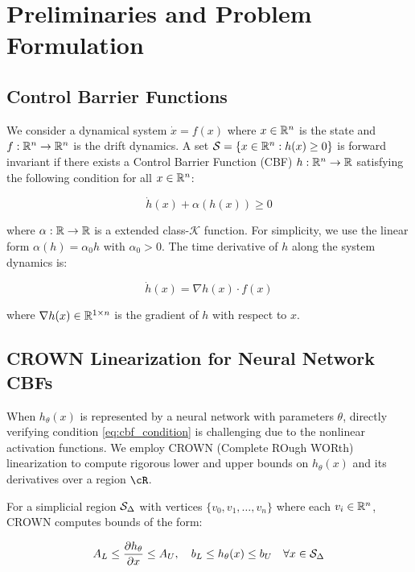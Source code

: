 \section{Preliminaries and Problem Formulation}

\subsection{Control Barrier Functions}

We consider a dynamical system $\dot{x} = f(x)$ where $x \in \mathbb{R}^n$ is the state and $f: \mathbb{R}^n \to \mathbb{R}^n$ is the drift dynamics. A set $\mathcal{S} = \{x \in \mathbb{R}^n : h(x) \geq 0\}$ is forward invariant if there exists a Control Barrier Function (CBF) $h: \mathbb{R}^n \to \mathbb{R}$ satisfying the following condition for all $x \in \mathbb{R}^n$:

\begin{equation}
    \dot{h}(x) + \alpha(h(x)) \geq 0
    \label{eq:cbf_condition}
\end{equation}

where $\alpha: \mathbb{R} \to \mathbb{R}$ is a extended class-$\mathcal{K}$ function. For simplicity, we use the linear form $\alpha(h) = \alpha_0 h$ with $\alpha_0 > 0$. The time derivative of $h$ along the system dynamics is:

\begin{equation}
    \dot{h}(x) = \nabla h(x) \cdot f(x)
\end{equation}

where $\nabla h(x) \in \mathbb{R}^{1 \times n}$ is the gradient of $h$ with respect to $x$.

\subsection{CROWN Linearization for Neural Network CBFs}

When $h_\theta(x)$ is represented by a neural network with parameters $\theta$, directly verifying condition \eqref{eq:cbf_condition} is challenging due to the nonlinear activation functions. We employ CROWN (Complete ROugh WORth) linearization to compute rigorous lower and upper bounds on $h_\theta(x)$ and its derivatives over a region $\cR$.

For a simplicial region $\mathcal{S}_\Delta$ with vertices $\{v_0, v_1, \ldots, v_n\}$ where each $v_i \in \mathbb{R}^n$, CROWN computes bounds of the form:

\begin{equation}
    A_L \leq \frac{\partial h_\theta}{\partial x} \leq A_U, \quad b_L \leq h_\theta(x) \leq b_U \quad \forall x \in \mathcal{S}_\Delta
    \label{eq:crown_bounds}
\end{equation}

